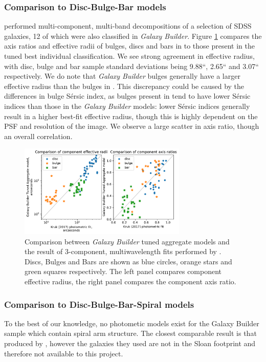 \documentclass[../main.tex]{subfiles}
\begin{document}
\subsubsection{Comparison to Disc-Bulge-Bar models}

\citet{2018MNRAS.473.4731K} performed multi-component, multi-band decompositions of a selection of SDSS galaxies, 12 of which were also classified in \textit{Galaxy Builder}. Figure \ref{fig:sd_comp_comparison} compares the axis ratios and effective radii of bulges, discs and bars in \citet{2018MNRAS.473.4731K} to those present in the tuned best individual classification. We see strong agreement in effective radius, with disc, bulge and bar sample standard deviations being 9.88``, 2.65`` and 3.07`` respectively. We do note that \textit{Galaxy Builder} bulges generally have a larger effective radius than the bulges in \citet{2018MNRAS.473.4731K}. This discrepancy could be caused by the differences in bulge S\'ersic index, as bulges present in \citet{2018MNRAS.473.4731K} tend to have lower S\'ersic indices than those in the \textit{Galaxy Builder} models: lower Sérsic indices generally result in a higher best-fit effective radius, though this is highly dependent on the PSF and resolution of the image. We observe a large scatter in axis ratio, though an overall correlation.


\begin{figure}
  \includegraphics[width=8cm]{images__results/sd_comp_comparison.pdf}
  \caption{Comparison between \textit{Galaxy Builder} tuned aggregate models and the result of 3-component, multi\-wavelength fits performed by \citet{2018MNRAS.473.4731K}. Discs, Bulges and Bars are shown as blue circles, orange stars and green squares respectively. The left panel compares component effective radius, the right panel compares the component axis ratio.}
  \label{fig:sd_comp_comparison}
\end{figure}


\subsubsection{Comparison to Disc-Bulge-Bar-Spiral models}
To the best of our knowledge, no photometic models exist for the Galaxy Builder sample which contain spiral arm structure. The closest comparable result is that produced by \citet{Gao2017:1709.00746v1}, however the galaxies they used are not in the Sloan footprint and therefore not available to this project.
\end{document}
